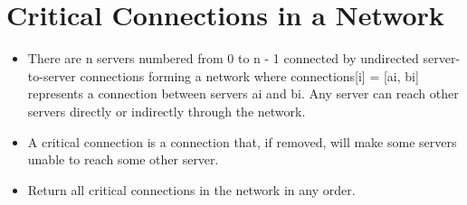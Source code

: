 \documentclass[9pt, b5paaper]{book}
\begin{document}
\section{Critical Connections in a Network}
\label{sec-11-5}
\begin{itemize}
\item There are n servers numbered from 0 to n - 1 connected by undirected server-to-server connections forming a network where connections[i] = [ai, bi] represents a connection between servers ai and bi. Any server can reach other servers directly or indirectly through the network.
\item A critical connection is a connection that, if removed, will make some servers unable to reach some other server.
\item Return all critical connections in the network in any order.
\end{itemize}
\end{document}
